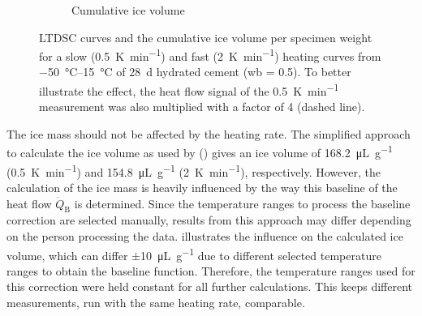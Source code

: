 \begin{figure}[!htb]
\begin{subfigure}{.485\textwidth}
	  \caption{Cumulative ice volume}
	  \label{fig:ltdsc_result_heating_rate_b}

	\end{subfigure}

    \caption{
		\ac{LTDSC} curves and the cumulative ice volume per specimen weight for a slow (\qty{0.5}{\kelvin\per\minute}) and fast (\qty{2}{\kelvin\per\minute}) heating curves from \qtyrange{-50}{15}{\celsius} of \qty{28}{\day} hydrated cement (\ac{wb} = \num{0.5}).
		To better illustrate the effect, the heat flow signal of the \qty{0.5}{\kelvin\per\minute} measurement was also multiplied with a factor of \num{4} (dashed line).
	}
    \label{fig:ltdsc_result_heating_rate}
\end{figure}

The ice mass should not be affected by the heating rate.
The simplified approach to calculate the ice volume as used by \textcite{mueller.2021,unbehau.2025} () gives an ice volume of \qty{168.2}{\micro\liter\per\gram} (\qty{0.5}{\kelvin\per\minute}) and \qty{154.8}{\micro\liter\per\gram} (\qty{2}{\kelvin\per\minute}), respectively.
However, the calculation of the ice mass is heavily influenced by the way this baseline of the heat flow $\dot{Q}_\text{B}$ is determined.
Since the temperature ranges to process the baseline correction are selected manually, results from this approach may differ depending on the person processing the data.
 illustrates the influence on the calculated ice volume, which can differ $\pm$\qty{10}{\micro\liter\per\gram} due to different selected temperature ranges to obtain the baseline function.
Therefore, the temperature ranges used for this correction were held constant for all further calculations.
This keeps different measurements, run with the same heating rate, comparable.

